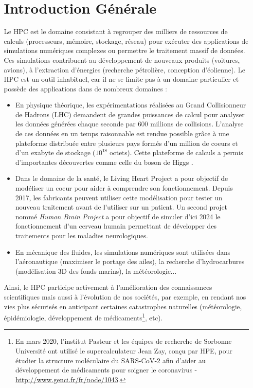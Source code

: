 \chapter{Introduction Générale} \label{chap:intro}
        
Le \gls{HPC} est le domaine  consistant à regrouper des milliers de ressources de calculs (processeurs, mémoire, stockage, réseau) pour exécuter des applications de simulations numériques complexes ou permettre le traitement massif de données. Ces simulations contribuent au développement de nouveaux produits (voitures, avions), à l'extraction d'énergies (recherche pétrolière, conception d'éolienne). Le HPC est un outil inhabituel, car il ne se limite pas à un domaine particulier et possède des applications dans de nombreux domaines :
\begin{itemize}
    \item En physique théorique, les expérimentations réalisées au Grand Collisionneur de Hadrons (LHC) demandent de grandes puissances de calcul pour analyser les données générées chaque seconde par 600 millions de collisions. L'analyse de ces données en un temps raisonnable est rendue possible grâce à une plateforme distribuée entre plusieurs pays formés d'un million de coeurs et d'un exabyte de stockage ($10^{18}$ octets). Cette plateforme de calculs a permis d'importantes découvertes comme celle du boson de Higgs \cite{Belyaev2017}. 
    
    \item Dans le domaine de la santé, le Living Heart Project \cite{Baillargeon2014} a pour objectif de modéliser un coeur pour aider à comprendre son fonctionnement. Depuis 2017, les fabricants peuvent utiliser cette modélisation pour tester un nouveau traitement avant de l'utiliser sur un patient. Un second projet nommé \textit{Human Brain Project} \cite{Markram2012} a pour objectif de simuler d'ici 2024 le fonctionnement d'un cerveau humain permettant de développer des traitements pour les maladies neurologiques.
    
    \item En mécanique des fluides, les simulations numériques sont utilisées dans l'aéronautique (maximiser le portage des ailes), la recherche d'hydrocarbures (modélisation 3D des fonds marins), la météorologie...

\end{itemize}
Ainsi, le HPC participe activement à l'amélioration des connaissances scientifiques mais aussi à l'évolution de nos sociétés, par exemple, en rendant nos vies plus sécurisés en anticipant certaines catastrophes naturelles (météorologie, épidémiologie, développement de médicaments\footnote{En mars 2020, l'institut Pasteur et les équipes de recherche de Sorbonne Université ont utilisé le supercalculateur Jean Zay, conçu par HPE, pour étudier la structure moléculaire du SARS-CoV-2 afin d'aider au développement de médicaments pour soigner le coronavirus - \url{http://www.genci.fr/fr/node/1043}.}, etc).

